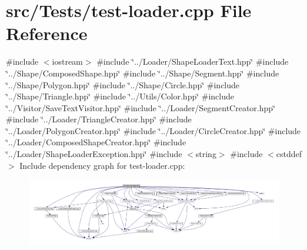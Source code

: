 \hypertarget{test-loader_8cpp}{}\section{src/\+Tests/test-\/loader.cpp File Reference}
\label{test-loader_8cpp}
{\ttfamily \#include $<$iostream$>$}\newline
{\ttfamily \#include \char`\"{}../\+Loader/\+Shape\+Loader\+Text.\+hpp\char`\"{}}\newline
{\ttfamily \#include \char`\"{}../\+Shape/\+Composed\+Shape.\+hpp\char`\"{}}\newline
{\ttfamily \#include \char`\"{}../\+Shape/\+Segment.\+hpp\char`\"{}}\newline
{\ttfamily \#include \char`\"{}../\+Shape/\+Polygon.\+hpp\char`\"{}}\newline
{\ttfamily \#include \char`\"{}../\+Shape/\+Circle.\+hpp\char`\"{}}\newline
{\ttfamily \#include \char`\"{}../\+Shape/\+Triangle.\+hpp\char`\"{}}\newline
{\ttfamily \#include \char`\"{}../\+Utils/\+Color.\+hpp\char`\"{}}\newline
{\ttfamily \#include \char`\"{}../\+Visitor/\+Save\+Text\+Visitor.\+hpp\char`\"{}}\newline
{\ttfamily \#include \char`\"{}../\+Loader/\+Segment\+Creator.\+hpp\char`\"{}}\newline
{\ttfamily \#include \char`\"{}../\+Loader/\+Triangle\+Creator.\+hpp\char`\"{}}\newline
{\ttfamily \#include \char`\"{}../\+Loader/\+Polygon\+Creator.\+hpp\char`\"{}}\newline
{\ttfamily \#include \char`\"{}../\+Loader/\+Circle\+Creator.\+hpp\char`\"{}}\newline
{\ttfamily \#include \char`\"{}../\+Loader/\+Composed\+Shape\+Creator.\+hpp\char`\"{}}\newline
{\ttfamily \#include \char`\"{}../\+Loader/\+Shape\+Loader\+Exception.\+hpp\char`\"{}}\newline
{\ttfamily \#include $<$string$>$}\newline
{\ttfamily \#include $<$cstddef$>$}\newline
Include dependency graph for test-\/loader.cpp\+:\nopagebreak
\begin{figure}[H]
\begin{center}
\leavevmode
\includegraphics[width=350pt]{test-loader_8cpp__incl}
\end{center}
\end{figure}
